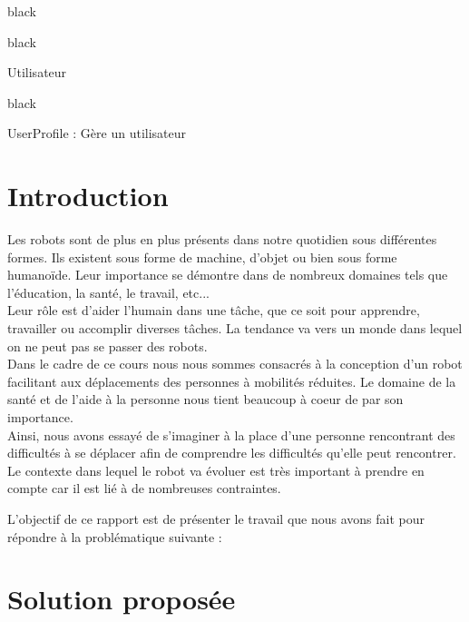{\begin{items}{black}{\Bullet}
\begin{items}{black}{\Triangle}
\item Utilisateur

\begin{items}{black}{\Bullet}
\item UserProfile : Gère un utilisateur
\end{items}

\end{items}

\end {items}\chapter{Introduction}
Les robots sont de plus en plus présents dans notre quotidien sous différentes formes. Ils existent sous forme de machine, d'objet ou bien sous forme humanoïde. 
Leur importance se démontre dans de nombreux domaines tels que l'éducation, la santé, le travail, etc... \\
Leur rôle est d'aider l'humain dans une tâche, que ce soit pour apprendre, travailler ou accomplir diverses tâches.  La tendance va vers un monde dans lequel on ne peut pas se passer des robots. \\

Dans le cadre de ce cours nous nous sommes consacrés à la conception d'un robot facilitant aux déplacements des personnes à mobilités réduites. Le domaine de la santé et de l'aide à la personne nous tient beaucoup à coeur de par son importance. \\

Ainsi, nous avons essayé de s'imaginer à la place d'une personne rencontrant des difficultés à se déplacer afin de comprendre les difficultés qu'elle peut rencontrer. Le contexte dans lequel le robot va évoluer est très important à prendre en compte car il est lié à de nombreuses contraintes. 

L'objectif de ce rapport est de présenter le travail que nous avons fait pour répondre à la problématique suivante : \\




\chapter{Solution proposée}

}
